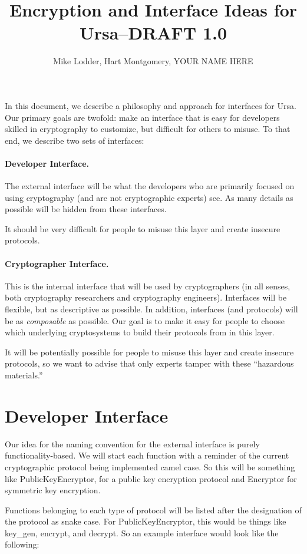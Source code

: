 \documentclass[letterpaper,11pt]{article}
\title{Encryption and Interface Ideas for Ursa--DRAFT 1.0}
\author{Mike Lodder, Hart Montgomery, YOUR NAME HERE}
\begin{document}
\maketitle

In this document, we describe a philosophy and approach for interfaces for Ursa.  Our primary goals are twofold:  make an interface that is easy for developers skilled in cryptography to customize, but difficult for others to misuse.  To that end, we describe two sets of interfaces:

\paragraph{Developer Interface.}  The external interface will be what the developers who are primarily focused on using cryptography (and are not cryptographic experts) see.  As many details as possible will be hidden from these interfaces.

It should be very difficult for people to misuse this layer and create insecure protocols.

\paragraph{Cryptographer Interface.}  This is the internal interface that will be used by cryptographers (in all senses, both cryptography researchers and cryptography engineers).  Interfaces will be flexible, but as descriptive as possible.  In addition, interfaces (and protocols) will be as \emph{composable} as possible.  Our goal is to make it easy for people to choose which underlying cryptosystems to build their protocols from in this layer.

It will be potentially possible for people to misuse this layer and create insecure protocols, so we want to advise that only experts tamper with these ``hazardous materials.''

\section{Developer Interface}
Our idea for the naming convention for the external interface is purely functionality-based.  We will start each function with a reminder of the current cryptographic protocol being implemented camel case.  So this will be something like PublicKeyEncryptor, for a public key encryption protocol and Encryptor for symmetric key encryption.

Functions belonging to each type of protocol will be listed after the designation of the protocol as snake case.  For PublicKeyEncryptor, this would be things like key\_gen, encrypt, and decrypt.  So an example interface would look like the following:
\end{document}
